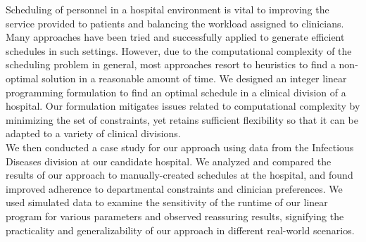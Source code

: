 Scheduling of personnel in a hospital environment is vital to improving the
service provided to patients and balancing the workload assigned to clinicians.
Many approaches have been tried and successfully applied to generate efficient
schedules in such settings. However, due to the computational complexity of the
scheduling problem in general, most approaches resort to heuristics to find a
non-optimal solution in a reasonable amount of time. We designed an integer
linear programming formulation to find an optimal schedule in a clinical
division of a hospital. Our formulation mitigates issues related to
computational complexity by minimizing the set of constraints, yet retains
sufficient flexibility so that it can be adapted to a variety of clinical
divisions. \\

We then conducted a case study for our approach using data from the Infectious
Diseases division at our candidate hospital. We analyzed and
compared the results of our approach to manually-created schedules at the
hospital, and found improved adherence to departmental constraints and clinician
preferences. We used simulated data to examine the sensitivity of the runtime of
our linear program for various parameters and observed reassuring results,
signifying the practicality and generalizability of our approach in different
real-world scenarios.
